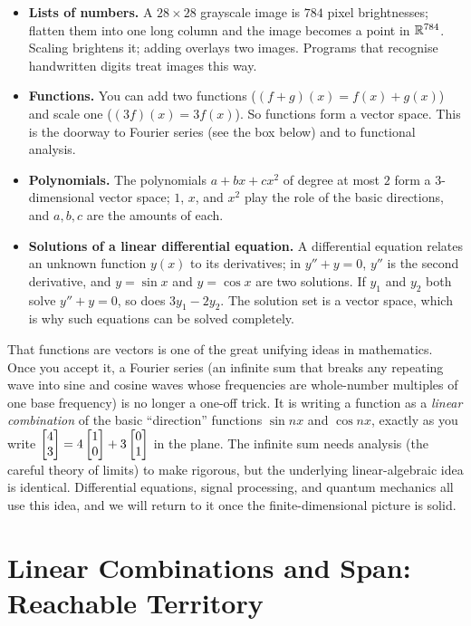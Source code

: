 \begin{itemize}
  \item \textbf{Lists of numbers.} A $28\times 28$ grayscale image is $784$ pixel brightnesses;
  flatten them into one long column and the image becomes a point in $\mathbb{R}^{784}$. Scaling brightens it;
  adding overlays two images. Programs that recognise handwritten digits treat images this way.
  \item \textbf{Functions.} You can add two functions ($(f+g)(x)=f(x)+g(x)$) and scale one
  ($(3f)(x)=3f(x)$). So functions form a vector space. This is the doorway to Fourier series (see the
  box below) and to functional analysis.
  \item \textbf{Polynomials.} The polynomials $a+bx+cx^2$ of degree at most $2$ form a $3$-dimensional vector
  space; $1$, $x$, and $x^2$ play the role of the basic directions, and $a,b,c$ are the amounts of each.
  \item \textbf{Solutions of a linear differential equation.} A differential equation relates an unknown
  function $y(x)$ to its derivatives; in $y'' + y = 0$, $y''$ is the second derivative, and $y=\sin x$
  and $y=\cos x$ are two solutions. If $y_1$ and $y_2$ both solve
  $y'' + y = 0$, so does $3y_1 - 2y_2$. The solution set is a vector space, which is why such
  equations can be solved completely.
\end{itemize}

\begin{connectionbox}
That functions are vectors is one of the great unifying ideas in mathematics. Once you accept
it, a Fourier series (an infinite sum that breaks any repeating wave into sine and cosine waves whose
frequencies are whole-number multiples of one base frequency) is no longer a one-off trick. It is
writing a function as a \emph{linear
combination} of the basic ``direction'' functions $\sin nx$ and $\cos nx$, exactly as you write
$\begin{bmatrix}4\\3\end{bmatrix} = 4\begin{bmatrix}1\\0\end{bmatrix} + 3\begin{bmatrix}0\\1\end{bmatrix}$ in the plane. The infinite sum needs analysis (the
careful theory of limits) to make rigorous, but the underlying linear-algebraic idea is identical.
Differential equations, signal processing, and quantum mechanics all use this idea, and we
will return to it once the finite-dimensional picture is solid.
\end{connectionbox}

\section{Linear Combinations and Span: Reachable Territory}


